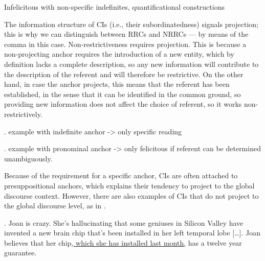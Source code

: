 %



Infelicitous with non-specific indefinites, quantificational constructions

The information structure of CIs (i.e., their subordinatedness) signals
projection; this is why we can distinguish between RRCs and NRRCs --- by
means of the comma in this case. Non-restrictiveness requires projection.
This is because a non-projecting anchor requires the introduction of a new
entity, which by definition lacks a complete description, so any new
information will contribute to the description of the referent and will
therefore be restrictive. On the other hand, in case the anchor projects,
this means that the referent has been established, in the sense that it can
be identified in the common ground, so providing new information does not
affect the choice of referent, so it works non-restrictively.

\ex. example with indefinite anchor -> only specific reading

\ex. example with pronominal anchor -> only felicitous if referent can be
  determined unambiguously.

Because of the requirement for a specific anchor, CIs are often attached to
presuppositional anchors, which explains their tendency to project to the
global discourse context. However, there are also examples of CIs that do
not project to the global discourse level, as in \Next \citep[example
from][]{amaral2007review}.

\ex. Joan is crazy. She's hallucinating that some geniuses in Silicon Valley
have invented a new brain chip that's been installed in her left temporal
lobe [\ldots]. Joan believes that her chip\underline{, which she has
installed last month,} has a twelve year guarantee.

